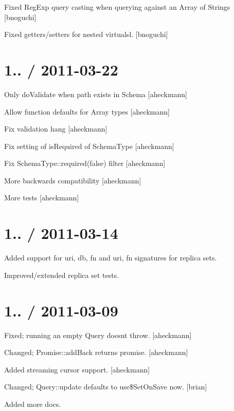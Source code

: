 \begin{DoxyItemize}
\item Fixed Reg\+Exp query casting when querying against an Array of Strings \mbox{[}bnoguchi\mbox{]}
\item Fixed getters/setters for nested virtualsl. \mbox{[}bnoguchi\mbox{]}
\end{DoxyItemize}

\section*{1.. / 2011-\/03-\/22 }


\begin{DoxyItemize}
\item Only do\+Validate when path exists in Schema \mbox{[}aheckmann\mbox{]}
\item Allow function defaults for Array types \mbox{[}aheckmann\mbox{]}
\item Fix validation hang \mbox{[}aheckmann\mbox{]}
\item Fix setting of is\+Required of Schema\+Type \mbox{[}aheckmann\mbox{]}
\item Fix Schema\+Type\+::required(false) filter \mbox{[}aheckmann\mbox{]}
\item More backwards compatibility \mbox{[}aheckmann\mbox{]}
\item More tests \mbox{[}aheckmann\mbox{]}
\end{DoxyItemize}

\section*{1.. / 2011-\/03-\/14 }


\begin{DoxyItemize}
\item Added support for {\ttfamily uri, db, fn} and {\ttfamily uri, fn} signatures for replica sets.
\item Improved/extended replica set tests.
\end{DoxyItemize}

\section*{1.. / 2011-\/03-\/09 }


\begin{DoxyItemize}
\item Fixed; running an empty Query doesn\textquotesingle{}t throw. \mbox{[}aheckmann\mbox{]}
\item Changed; Promise\+::add\+Back returns promise. \mbox{[}aheckmann\mbox{]}
\item Added streaming cursor support. \mbox{[}aheckmann\mbox{]}
\item Changed; Query\+::update defaults to use\$\+Set\+On\+Save now. \mbox{[}brian\mbox{]}
\item Added more docs.
\end{DoxyItemize}

